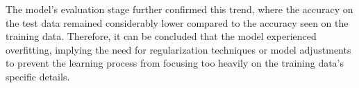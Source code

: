\noindent The model's evaluation stage further confirmed this trend, where the accuracy on the test data remained considerably lower compared to the accuracy seen on the training data. Therefore, it can be concluded that the model experienced overfitting, implying the need for regularization techniques or model adjustments to prevent the learning process from focusing too heavily on the training data's specific details.